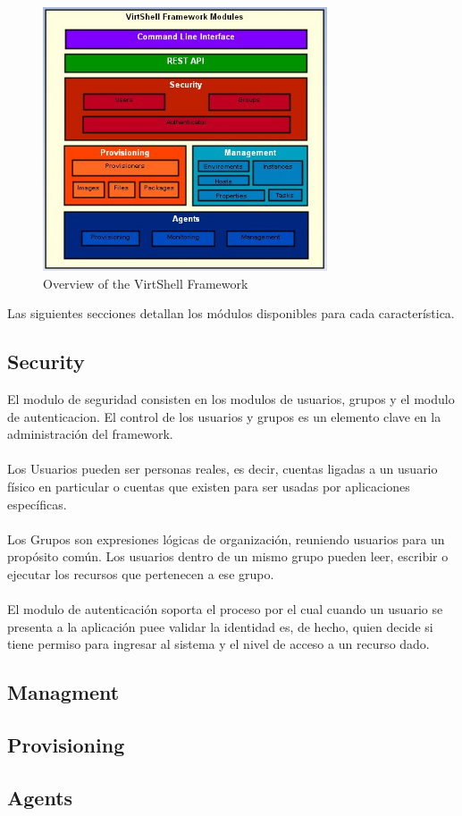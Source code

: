 \begin{figure}
	\caption{Overview of the VirtShell Framework}
	\includegraphics[width = 0.75\textwidth]{figures/framework}
\end{figure}

Las siguientes secciones detallan los módulos disponibles para cada característica. 

\subsection{Security}
El modulo de seguridad consisten en los modulos de usuarios, grupos y el modulo de autenticacion. El control de los usuarios y grupos es un elemento clave en la administración del framework.\\
\\
Los Usuarios pueden ser personas reales, es decir, cuentas ligadas a un usuario físico en particular o cuentas que existen para ser usadas por aplicaciones específicas.\\
\\
Los Grupos son expresiones lógicas de organización, reuniendo usuarios para un propósito común. Los usuarios dentro de un mismo grupo pueden leer, escribir o ejecutar los recursos que pertenecen a ese grupo.\\
\\
El modulo de autenticación soporta el proceso por el cual cuando un usuario se presenta a la aplicación puee validar la identidad es, de hecho, quien decide si tiene permiso para ingresar al sistema y el nivel de acceso a un recurso dado.

\subsection{Managment}

\subsection{Provisioning}

\subsection{Agents}


